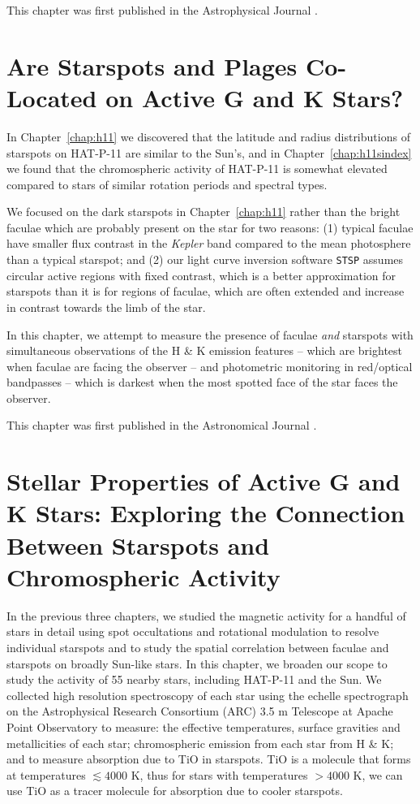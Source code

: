 \documentclass[12pt, twoside]{uwthesis}
\newcommand{\kepler}{\textsl{Kepler}\xspace}
\newcommand{\stsp}{\texttt{STSP}\xspace}
\begin{document}
This chapter was first published in the Astrophysical Journal \citep{Morris2017b}.



\chapter{Are Starspots and Plages Co-Located on Active G and K Stars?} \label{chap:nephelion}

In Chapter~\ref{chap:h11} we discovered that the latitude and radius distributions of starspots on HAT-P-11 are similar to the Sun's, and in Chapter~\ref{chap:h11sindex} we found that the chromospheric activity of HAT-P-11 is somewhat elevated compared to stars of similar rotation periods and spectral types. 

We focused on the dark starspots in Chapter~\ref{chap:h11} rather than the bright faculae which are probably present on the star for two reasons: (1) typical faculae have smaller flux contrast in the \kepler band compared to the mean photosphere than a typical starspot; and (2) our light curve inversion software \stsp assumes circular active regions with fixed contrast, which is a better approximation for starspots than it is for regions of faculae, which are often extended and increase in contrast towards the limb of the star. 

In this chapter, we attempt to measure the presence of faculae \textit{and} starspots with simultaneous observations of the  H \& K emission features -- which are brightest when faculae are facing the observer -- and photometric monitoring in red/optical bandpasses -- which is darkest when the most spotted face of the star faces the observer. 

This chapter was first published in the Astronomical Journal \citep{Morris2018g}. 



\chapter{Stellar Properties of Active G and K Stars: Exploring the Connection Between Starspots and Chromospheric Activity} \label{chap:freckles}

In the previous three chapters, we studied the magnetic activity for a handful of stars in detail using spot occultations and rotational modulation to resolve individual starspots and to study the spatial correlation between faculae and starspots on broadly Sun-like stars. In this chapter, we broaden our scope to study the activity of 55 nearby stars, including HAT-P-11 and the Sun. We collected high resolution spectroscopy of each star using the echelle spectrograph on the Astrophysical Research Consortium (ARC) 3.5 m Telescope at Apache Point Observatory to measure: the effective temperatures, surface gravities and metallicities of each star; chromospheric emission from each star from  H \& K; and to measure absorption due to TiO in starspots. TiO is a molecule that forms at temperatures $\lesssim 4000$ K, thus for stars with temperatures $>4000$ K, we can use TiO as a tracer molecule for absorption due to cooler starspots. 
\end{document}
